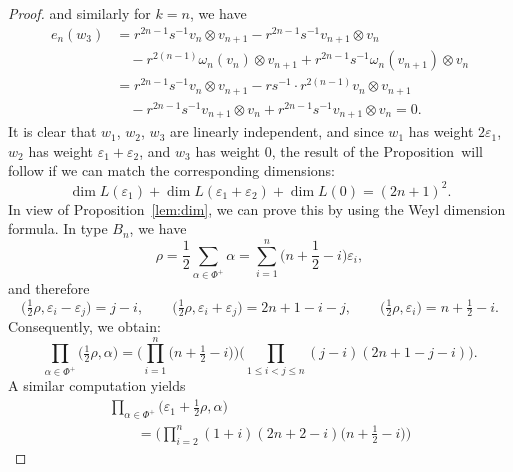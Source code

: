 \documentclass[pdftex]{sigma}
\numberwithin{equation}{section}
\begin{document}
\begin{proof}
and similarly for $k = n$, we have
\begin{displaymath}
\begin{split}
 e_{n}(w_{3}) &=
 r^{2n-1}s^{-1} v_{n} \otimes v_{n+1} - r^{2n-1}s^{-1} v_{n+1} \otimes v_{n}
 \\
 &\quad- r^{2(n-1)} \omega_n(v_{n}) \otimes v_{n+1} + r^{2n-1}s^{-1} \omega_n(v_{n+1}) \otimes v_{n} \\
 &= r^{2n - 1}s^{-1}v_{n} \otimes v_{n+1}- rs^{-1}\cdot r^{2(n-1)}v_{n} \otimes v_{n+1} \\
 &\quad - r^{2n - 1}s^{-1}v_{n+1} \otimes v_{n} + r^{2n - 1}s^{-1}v_{n+1} \otimes v_{n} = 0.
\end{split}
\end{displaymath}
It is clear that $w_{1}$, $w_{2}$, $w_{3}$ are linearly independent, and since $w_{1}$ has weight $2\varepsilon_{1}$, $w_{2}$ has weight ${\varepsilon_{1} + \varepsilon_{2}}$, and $w_{3}$ has weight $0$, the result of the Proposition~will follow if we can match the corresponding dimensions:
\begin{equation}\label{eq:dim-sum}
 \dim{L(\varepsilon_{1})} + \dim{L(\varepsilon_{1} + \varepsilon_{2})} + \dim{L(0)} = (2n + 1)^{2}.
\end{equation}
In view of Proposition~\ref{lem:dim}, we can prove this by using the Weyl dimension formula. In type $B_{n}$, we have
\begin{displaymath}
 \rho = \frac{1}{2}\sum_{\alpha \in \Phi^{+}} \alpha =
 \sum_{i = 1}^{n}\biggl(n + \frac{1}{2} - i\biggr)\varepsilon_{i},
\end{displaymath}
and therefore
\begin{displaymath}
 \bigl(\tfrac{1}{2}\rho,\varepsilon_{i} - \varepsilon_{j}\bigr) = j - i, \qquad
 \bigl(\tfrac{1}{2}\rho,\varepsilon_{i} + \varepsilon_{j}\bigr) = 2n + 1 - i - j, \qquad
 \bigl(\tfrac{1}{2}\rho,\varepsilon_{i}\bigr) = n + \tfrac{1}{2} - i.
\end{displaymath}
Consequently, we obtain:
\begin{displaymath}
 \prod_{\alpha \in \Phi^{+}}\bigl(\tfrac{1}{2}\rho ,\alpha\bigr) =
 \Biggl( \prod_{i = 1}^{n} \bigl(n + \tfrac{1}{2} - i \bigr) \Biggr)
 \biggl( \prod_{1 \le i < j \le n}(j - i)(2n + 1 - j - i) \biggr).
\end{displaymath}
A similar computation yields
\begin{gather*}
 \prod_{\alpha \in \Phi^{+}}\bigl(\varepsilon_{1} + \tfrac{1}{2}\rho,\alpha\bigr) \\
 \qquad{}=
 \Biggl( \prod_{i = 2}^{n}(1 + i)(2n + 2 - i)\bigl(n + \tfrac{1}{2} - i\bigr)\Biggr)

\end{gather*}
\end{proof}
\end{document}
